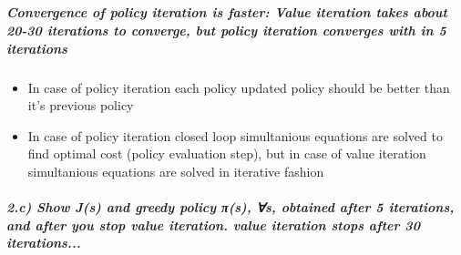 \documentclass[11pt]{article}
\providecommand{\tightlist}{%
      \setlength{\itemsep}{0pt}\setlength{\parskip}{0pt}}
\begin{document}
    \begin{center}
    \end{center}
    { \hspace*{\fill} \\}
    
    \begin{center}
    \end{center}
    { \hspace*{\fill} \\}
    
    \begin{center}
    \end{center}
    { \hspace*{\fill} \\}
    
    \subparagraph{Convergence of policy iteration is faster: Value iteration
takes about 20-30 iterations to converge, but policy iteration converges
with in 5
iterations}\label{convergence-of-policy-iteration-is-faster-value-iteration-takes-about-20-30-iterations-to-converge-but-policy-iteration-converges-with-in-5-iterations}

\begin{itemize}
\tightlist
\item
  In case of policy iteration each policy updated policy should be
  better than it's previous policy
\item
  In case of policy iteration closed loop simultanious equations are
  solved to find optimal cost (policy evaluation step), but in case of
  value iteration simultanious equations are solved in iterative fashion
\end{itemize}

    \subparagraph{2.c) Show J(s) and greedy policy π(s), ∀s, obtained after
5 iterations, and after you stop value iteration. value iteration stops
after 30
iterations...}\label{c-show-js-and-greedy-policy-ux3c0s-s-obtained-after-5-iterations-and-after-you-stop-value-iteration.-value-iteration-stops-after-30-iterations...}
\end{document}
